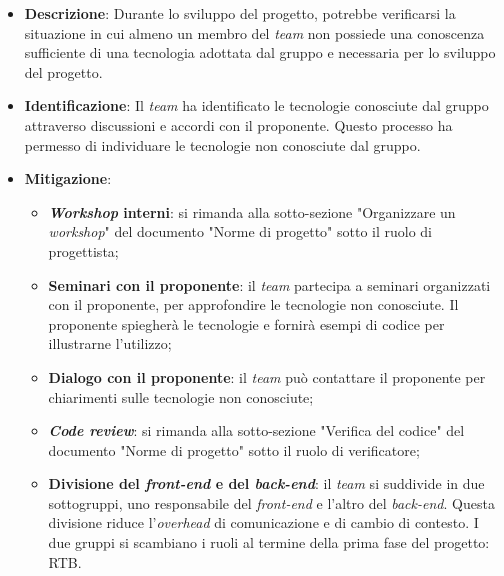 \label{risk:conoscenza tecnologie carente}
\begin{itemize}
	\item \textbf{Descrizione}:
		Durante lo sviluppo del progetto, potrebbe verificarsi la situazione 
		in cui almeno un membro del \textit{team} non possiede una conoscenza 
		sufficiente di una tecnologia adottata dal gruppo e necessaria per 
		lo sviluppo del progetto.

	\item \textbf{Identificazione}: 
		Il \textit{team} ha identificato le tecnologie conosciute dal gruppo 
		attraverso discussioni e accordi con il proponente. 
		Questo processo ha permesso di individuare le tecnologie non conosciute dal gruppo.

	\item \textbf{Mitigazione}:
	      \begin{itemize}
		      \item \textbf{\textit{Workshop} interni}: si rimanda alla
		            sotto-sezione "Organizzare un \textit{workshop}" del
		            documento "Norme di progetto" sotto il ruolo di progettista;

		      \item \textbf{Seminari con il proponente}: il \textit{team}
		            partecipa a seminari organizzati con il proponente, per approfondire
		            le tecnologie non conosciute. 
					Il proponente spiegherà le tecnologie e fornirà esempi di codice
		            per illustrarne l'utilizzo;

		      \item \textbf{Dialogo con il proponente}: il \textit{team} può
		            contattare il proponente per chiarimenti sulle
		            tecnologie non conosciute;

		      \item \textbf{\textit{Code review}}: si rimanda alla sotto-sezione
		            "Verifica del codice" del documento "Norme di progetto"
		            sotto il ruolo di verificatore;

		      \item \textbf{Divisione del \textit{front-end} e del \textit{back-end}}: 
			  		il \textit{team} si suddivide in due sottogruppi, uno responsabile del 
					\textit{front-end} e l'altro del \textit{back-end}. 
					Questa divisione riduce l'\textit{overhead} di comunicazione e di cambio di
		            contesto. I due gruppi si scambiano i ruoli al termine della prima 
					fase del progetto: RTB.
	      \end{itemize}
\end{itemize}
